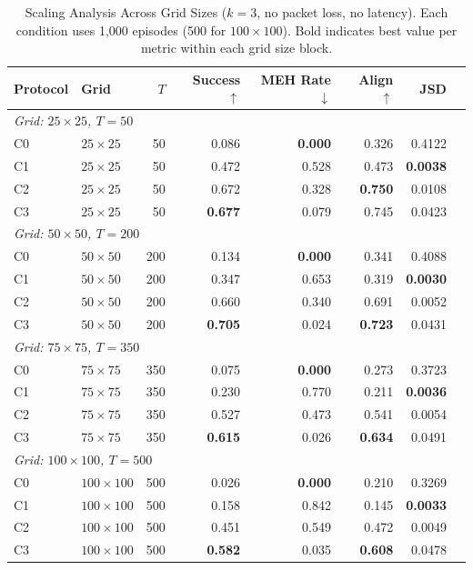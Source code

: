 \documentclass[pdflatex,sn-mathphys-num]{sn-jnl}%
\theoremstyle{thmstyleone}%
\theoremstyle{thmstyletwo}%
\theoremstyle{thmstylethree}%
\begin{document}
\begin{table}[htbp]
\centering
\caption{Scaling Analysis Across Grid Sizes ($k=3$, no packet loss, no latency). Each condition uses 1{,}000 episodes (500 for $100 \times 100$). Bold indicates best value per metric within each grid size block.}
\label{scaling}
\small
\begin{tabular}{llrrrrrr}
\toprule
Protocol & Grid & $T$ & Success $\uparrow$ & MEH Rate $\downarrow$ & Align $\uparrow$ & JSD \\
\midrule
\multicolumn{7}{l}{\textit{Grid: $25\times 25$, $T=50$}} \\
\addlinespace[2pt]
C0 & $25\times25$ & 50 & 0.086 & \textbf{0.000} & 0.326 & 0.4122 \\
C1 & $25\times25$ & 50 & 0.472 & 0.528 & 0.473 & \textbf{0.0038} \\
C2 & $25\times25$ & 50 & 0.672 & 0.328 & \textbf{0.750} & 0.0108 \\
C3 & $25\times25$ & 50 & \textbf{0.677} & 0.079 & 0.745 & 0.0423 \\
\midrule
\multicolumn{7}{l}{\textit{Grid: $50\times 50$, $T=200$}} \\
\addlinespace[2pt]
C0 & $50\times50$ & 200 & 0.134 & \textbf{0.000} & 0.341 & 0.4088 \\
C1 & $50\times50$ & 200 & 0.347 & 0.653 & 0.319 & \textbf{0.0030} \\
C2 & $50\times50$ & 200 & 0.660 & 0.340 & 0.691 & 0.0052 \\
C3 & $50\times50$ & 200 & \textbf{0.705} & 0.024 & \textbf{0.723} & 0.0431 \\
\midrule
\multicolumn{7}{l}{\textit{Grid: $75\times 75$, $T=350$}} \\
\addlinespace[2pt]
C0 & $75\times75$ & 350 & 0.075 & \textbf{0.000} & 0.273 & 0.3723 \\
C1 & $75\times75$ & 350 & 0.230 & 0.770 & 0.211 & \textbf{0.0036} \\
C2 & $75\times75$ & 350 & 0.527 & 0.473 & 0.541 & 0.0054 \\
C3 & $75\times75$ & 350 & \textbf{0.615} & 0.026 & \textbf{0.634} & 0.0491 \\
\midrule
\multicolumn{7}{l}{\textit{Grid: $100\times 100$, $T=500$}} \\
\addlinespace[2pt]
C0 & $100\times100$ & 500 & 0.026 & \textbf{0.000} & 0.210 & 0.3269 \\
C1 & $100\times100$ & 500 & 0.158 & 0.842 & 0.145 & \textbf{0.0033} \\
C2 & $100\times100$ & 500 & 0.451 & 0.549 & 0.472 & 0.0049 \\
C3 & $100\times100$ & 500 & \textbf{0.582} & 0.035 & \textbf{0.608} & 0.0478 \\
\bottomrule
\end{tabular}
\end{table}
\end{document}
